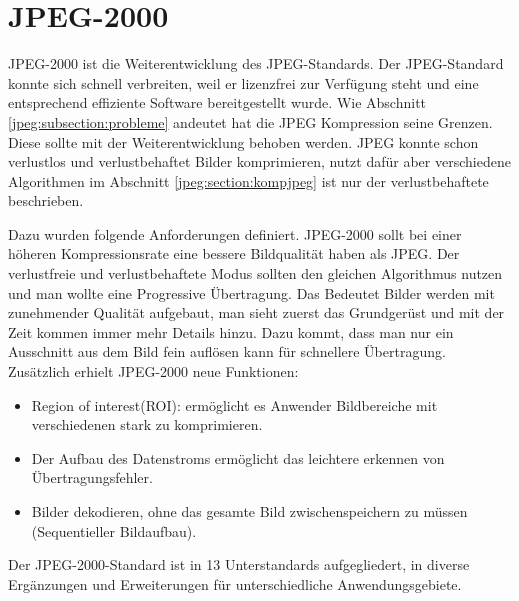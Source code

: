 %
%
%
%
\section{JPEG-2000 
\label{jpeg:section:jpeg2000}}
JPEG-2000 ist die Weiterentwicklung des JPEG-Standards.
Der JPEG-Standard konnte sich schnell verbreiten, weil er lizenzfrei zur Verfügung steht und eine entsprechend effiziente Software bereitgestellt wurde.
Wie Abschnitt \ref{jpeg:subsection:probleme} andeutet hat die JPEG Kompression seine Grenzen.
Diese sollte mit der Weiterentwicklung behoben werden. 
JPEG konnte schon verlustlos und verlustbehaftet Bilder komprimieren, nutzt dafür aber verschiedene Algorithmen im Abschnitt \ref{jpeg:section:kompjpeg} ist nur der verlustbehaftete beschrieben.

Dazu wurden folgende Anforderungen definiert.
JPEG-2000 sollt bei einer höheren Kompressionsrate eine bessere Bildqualität haben als JPEG.
Der verlustfreie und verlustbehaftete Modus sollten den gleichen Algorithmus nutzen und man wollte eine Progressive Übertragung.
Das Bedeutet Bilder werden mit zunehmender Qualität aufgebaut, man sieht zuerst das Grundgerüst und mit der Zeit kommen immer mehr Details hinzu.
Dazu kommt, dass man nur ein Ausschnitt aus dem Bild fein auflösen kann für schnellere Übertragung.
Zusätzlich erhielt JPEG-2000 neue Funktionen:
\begin{itemize}
    \item Region of interest(ROI): ermöglicht es Anwender Bildbereiche mit verschiedenen stark zu komprimieren.
    \item Der Aufbau des Datenstroms ermöglicht das leichtere erkennen von Übertragungsfehler.
    \item Bilder dekodieren, ohne das gesamte Bild zwischenspeichern zu müssen (Sequentieller Bildaufbau).
\end{itemize}
Der JPEG-2000-Standard ist in 13 Unterstandards aufgegliedert, in diverse Ergänzungen und Erweiterungen für unterschiedliche Anwendungsgebiete. 


